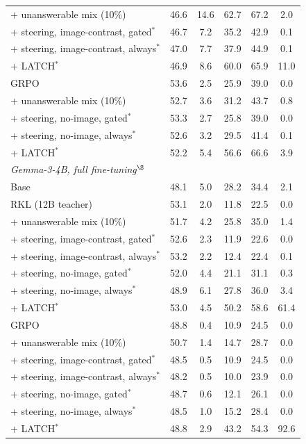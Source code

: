 \begin{table}[t]
\begin{tabular}{lccccc}
\quad + unanswerable mix (10\%)               & 46.6 & 14.6 & 62.7 & 67.2 &  2.0 \\
\quad + steering, image-contrast, gated$^\ast$  & 46.7 &  7.2 & 35.2 & 42.9 &  0.1 \\
\quad + steering, image-contrast, always$^\ast$ & 47.0 &  7.7 & 37.9 & 44.9 &  0.1 \\
\quad + LATCH$^\ast$                          & 46.9 &  8.6 & 60.0 & 65.9 & 11.0 \\
GRPO                                          & 53.6 &  2.5 & 25.9 & 39.0 &  0.0 \\
\quad + unanswerable mix (10\%)               & 52.7 &  3.6 & 31.2 & 43.7 &  0.8 \\
\quad + steering, no-image, gated$^\ast$      & 53.3 &  2.7 & 25.8 & 39.0 &  0.0 \\
\quad + steering, no-image, always$^\ast$     & 52.6 &  3.2 & 29.5 & 41.4 &  0.1 \\
\quad + LATCH$^\ast$                          & 52.2 &  5.4 & 56.6 & 66.6 &  3.9 \\
\midrule
\multicolumn{6}{l}{\textit{Gemma-3-4B, full fine-tuning$^\S$}} \\
Base                                          & 48.1 &  5.0 & 28.2 & 34.4 &  2.1 \\
RKL (12B teacher)                             & 53.1 &  2.0 & 11.8 & 22.5 &  0.0 \\
\quad + unanswerable mix (10\%)               & 51.7 &  4.2 & 25.8 & 35.0 &  1.4 \\
\quad + steering, image-contrast, gated$^\ast$  & 52.6 &  2.3 & 11.9 & 22.6 &  0.0 \\
\quad + steering, image-contrast, always$^\ast$ & 53.2 &  2.2 & 12.4 & 22.4 &  0.1 \\
\quad + steering, no-image, gated$^\ast$      & 52.0 &  4.4 & 21.1 & 31.1 &  0.3 \\
\quad + steering, no-image, always$^\ast$     & 48.9 &  6.1 & 27.8 & 36.0 &  3.4 \\
\quad + LATCH$^\ast$                          & 53.0 &  4.5 & 50.2 & 58.6 & 61.4 \\
GRPO                                          & 48.8 &  0.4 & 10.9 & 24.5 &  0.0 \\
\quad + unanswerable mix (10\%)               & 50.7 &  1.4 & 14.7 & 28.7 &  0.0 \\
\quad + steering, image-contrast, gated$^\ast$  & 48.5 &  0.5 & 10.9 & 24.5 &  0.0 \\
\quad + steering, image-contrast, always$^\ast$ & 48.2 &  0.5 & 10.0 & 23.9 &  0.0 \\
\quad + steering, no-image, gated$^\ast$      & 48.7 &  0.6 & 12.1 & 26.1 &  0.0 \\
\quad + steering, no-image, always$^\ast$     & 48.5 &  1.0 & 15.2 & 28.4 &  0.0 \\
\quad + LATCH$^\ast$                          & 48.8 &  2.9 & 43.2 & 54.3 & 92.6 \\
\bottomrule
\end{tabular}
\end{table}


